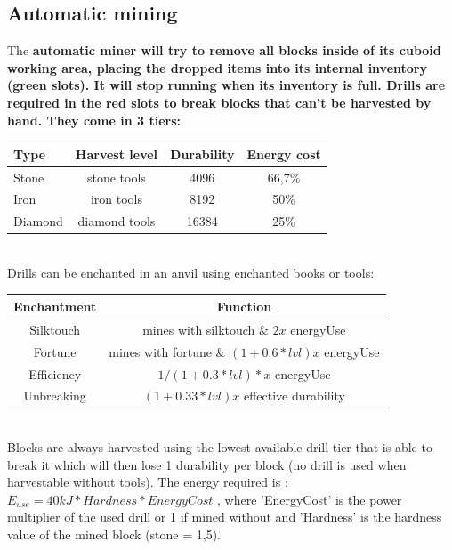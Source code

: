 \documentclass[11pt]{article} %
\begin{document}
\subsection{Automatic mining}
The \bf automatic miner \rm will try to remove all blocks inside of its cuboid working area, placing the dropped items into its internal inventory (green slots). It will stop running when its inventory is full. \bf Drills \rm are required in the red slots to break blocks that can't be harvested by hand. They come in 3 tiers:\\
\begin{tabular}{| l | c | c | c |} \hline  
\bf Type & \bf Harvest level & \bf Durability & \bf Energy cost \\ \hline
Stone & stone tools & 4096 & 66,7\% \\
Iron & iron tools & 8192 & 50\% \\
Diamond & diamond tools & 16384 & 25\% \\ \hline
\end{tabular} \\
Drills can be enchanted in an anvil using enchanted books or tools: \\
\begin{tabular}{| c | c |} \hline
\bf Enchantment & \bf Function \\ \hline
Silktouch & mines with silktouch \& $2x$ energyUse \\ \hline
Fortune & mines with fortune \& $(1+0.6*lvl)x$ energyUse \\ \hline
Efficiency & $1/(1+0.3*lvl)*x$ energyUse \\ \hline
Unbreaking & $(1+0.33*lvl)x$ effective durability \\ \hline
\end{tabular} \\
Blocks are always harvested using the lowest available drill tier that is able to break it which will then lose 1 durability per block (no drill is used when harvestable without tools). The energy required is : ${E_{use} = 40kJ * Hardness * EnergyCost}$ , where 'EnergyCost' is the power multiplier of the used drill or 1 if mined without and 'Hardness' is the hardness value of the mined block (stone = 1,5). 
\end{document}
